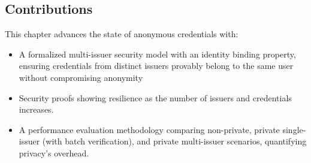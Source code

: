 \subsection{Contributions}
This chapter advances the state of anonymous credentials with:
\begin{itemize}
    \item A formalized multi-issuer security model with an identity binding property, ensuring credentials from distinct issuers provably belong to the same user without compromising anonymity
    \item Security proofs showing resilience as the number of issuers and credentials increases.
    \item A performance evaluation methodology comparing non-private, private single-issuer (with batch verification), and private multi-issuer scenarios, quantifying privacy’s overhead.
\end{itemize}


